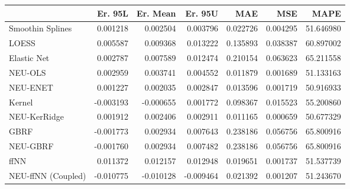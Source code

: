 \begin{tabular}{lrrrrrr}
\toprule
{} &   Er. 95L &  Er. Mean &   Er. 95U &       MAE &       MSE &       MAPE \\
\midrule
Smoothin Splines   &  0.001218 &  0.002504 &  0.003796 &  0.022726 &  0.004295 &  51.646980 \\
LOESS              &  0.005587 &  0.009368 &  0.013222 &  0.135893 &  0.038387 &  60.897002 \\
Elastic Net        &  0.002787 &  0.007589 &  0.012474 &  0.210154 &  0.063623 &  65.211558 \\
NEU-OLS            &  0.002959 &  0.003741 &  0.004552 &  0.011879 &  0.001689 &  51.133163 \\
NEU-ENET           &  0.001227 &  0.002035 &  0.002847 &  0.013596 &  0.001719 &  50.916933 \\
Kernel             & -0.003193 & -0.000655 &  0.001772 &  0.098367 &  0.015523 &  55.200860 \\
NEU-KerRidge       &  0.001912 &  0.002406 &  0.002911 &  0.011165 &  0.000659 &  50.677329 \\
GBRF               & -0.001773 &  0.002934 &  0.007643 &  0.238186 &  0.056756 &  65.800916 \\
NEU-GBRF           & -0.001760 &  0.002934 &  0.007482 &  0.238186 &  0.056756 &  65.800916 \\
ffNN               &  0.011372 &  0.012157 &  0.012948 &  0.019651 &  0.001737 &  51.537739 \\
NEU-ffNN (Coupled) & -0.010775 & -0.010128 & -0.009464 &  0.021392 &  0.001207 &  51.243670 \\
\bottomrule
\end{tabular}
